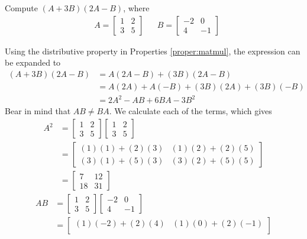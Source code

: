 \begin{exmp}
Compute $(A+3B)(2A-B)$, where
\begin{align*}
& A = 
\begin{bmatrix}
1 & 2 \\
3 & 5 
\end{bmatrix} &
& B = 
\begin{bmatrix}
-2 & 0 \\
4 & -1
\end{bmatrix}
\end{align*}
\end{exmp}
\begin{solution}
Using the distributive property in Properties \ref{proper:matmul}, the expression can be expanded to
\begin{align*}
(A+3B)(2A-B) &= A(2A-B) + (3B)(2A-B)\\
&= A(2A) + A(-B) + (3B)(2A) + (3B)(-B) \\
&= 2A^2 - AB + 6BA - 3B^2
\end{align*}
Bear in mind that $AB \neq BA$. We calculate each of the terms, which gives
\begin{align*}
A^2 &=
\begin{bmatrix}
1 & 2 \\
3 & 5 
\end{bmatrix}
\begin{bmatrix}
1 & 2 \\
3 & 5 
\end{bmatrix} \\
&=
\begin{bmatrix}
(1)(1)+(2)(3) & (1)(2)+(2)(5) \\
(3)(1)+(5)(3) & (3)(2)+(5)(5) 
\end{bmatrix} \\
&=
\begin{bmatrix}
7 & 12 \\
18 & 31 
\end{bmatrix}
\end{align*}
\begin{align*}
AB &= 
\begin{bmatrix}
1 & 2 \\
3 & 5 
\end{bmatrix}
\begin{bmatrix}
-2 & 0 \\
4 & -1
\end{bmatrix} \\
&=
\begin{bmatrix}
(1)(-2)+(2)(4) & (1)(0)+(2)(-1) \\

\end{bmatrix}
\end{align*}
\end{solution}
